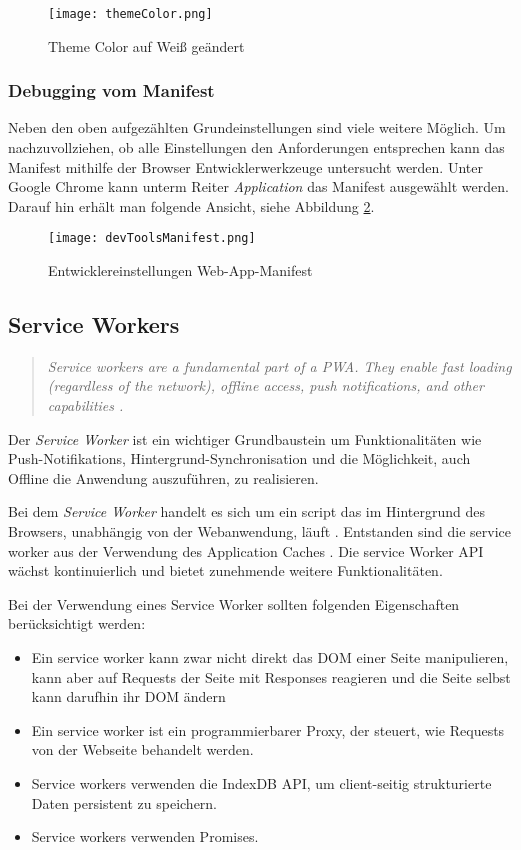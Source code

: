 \begin{figure}[!htb]
    \texttt{[image: themeColor.png]}
    \caption{Theme Color auf Weiß geändert}
    \label{img:themeColor}
\end{figure}

\subsubsection{Debugging vom Manifest}

Neben den oben aufgezählten Grundeinstellungen sind viele weitere Möglich. Um nachzuvollziehen, ob alle Einstellungen den Anforderungen entsprechen kann das Manifest mithilfe der Browser Entwicklerwerkzeuge untersucht werden. Unter Google Chrome kann unterm Reiter \textit{Application} das Manifest ausgewählt werden. Darauf hin erhält man folgende Ansicht, siehe Abbildung \ref{img:devManifest}.

\begin{figure}[!htb]
    \centering
    \texttt{[image: devToolsManifest.png]}
    \caption{Entwicklereinstellungen Web-App-Manifest}
    \label{img:devManifest}
\end{figure}


\newpage

\subsection{Service Workers}\label{sec:ServiceWorker}
\begin{quote}
    \textit{Service workers are a fundamental part of a PWA. They enable fast loading (regardless of the network), offline access, push notifications, and other capabilities \cite{Developers2022a}.}
\end{quote}

Der \textit{Service Worker} ist ein wichtiger Grundbaustein um Funktionalitäten wie Push-Notifikations, Hintergrund-Synchronisation und die Möglichkeit, auch Offline die Anwendung auszuführen, zu realisieren. 

Bei dem \textit{Service Worker} handelt es sich um ein script das im Hintergrund des Browsers, unabhängig von der Webanwendung, läuft \cite{Gaunt2021}. Entstanden sind die service worker aus der Verwendung des Application Caches . Die service Worker \ac{API} wächst kontinuierlich und bietet zunehmende weitere Funktionalitäten.

Bei der Verwendung eines Service Worker sollten folgenden Eigenschaften berücksichtigt werden: 
\begin{itemize}
    \item Ein service worker kann zwar nicht direkt das \ac{DOM} einer Seite manipulieren, kann aber auf Requests der Seite mit Responses reagieren und die Seite selbst kann darufhin ihr DOM ändern
    \item Ein service worker ist ein \glqq programmierbarer\grqq{} Proxy, der steuert, wie Requests von der Webseite behandelt werden.
    \item Service workers verwenden die IndexDB API, um client-seitig strukturierte Daten persistent zu speichern.
    \item Service workers verwenden Promises. 
\end{itemize}

